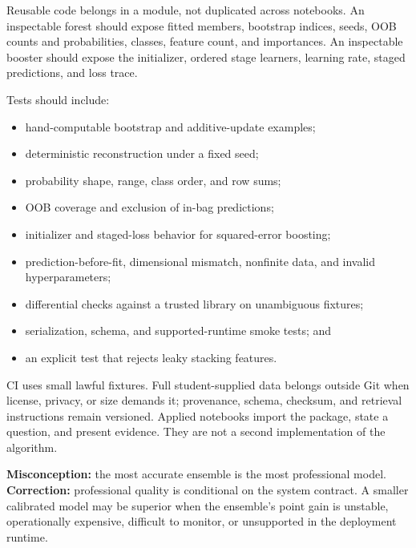 Reusable code belongs in a module, not duplicated across notebooks. An
inspectable forest should expose fitted members, bootstrap indices, seeds, OOB
counts and probabilities, classes, feature count, and importances. An
inspectable booster should expose the initializer, ordered stage learners,
learning rate, staged predictions, and loss trace.

Tests should include:
\begin{itemize}
  \item hand-computable bootstrap and additive-update examples;
  \item deterministic reconstruction under a fixed seed;
  \item probability shape, range, class order, and row sums;
  \item OOB coverage and exclusion of in-bag predictions;
  \item initializer and staged-loss behavior for squared-error boosting;
  \item prediction-before-fit, dimensional mismatch, nonfinite data, and invalid
  hyperparameters;
  \item differential checks against a trusted library on unambiguous fixtures;
  \item serialization, schema, and supported-runtime smoke tests; and
  \item an explicit test that rejects leaky stacking features.
\end{itemize}

CI uses small lawful fixtures. Full student-supplied data belongs outside Git
when license, privacy, or size demands it; provenance, schema, checksum, and
retrieval instructions remain versioned. Applied notebooks import the package,
state a question, and present evidence. They are not a second implementation of
the algorithm.

\begin{misconceptionbox}
\textbf{Misconception:} the most accurate ensemble is the most professional
model. \textbf{Correction:} professional quality is conditional on the system
contract. A smaller calibrated model may be superior when the ensemble's point
gain is unstable, operationally expensive, difficult to monitor, or unsupported
in the deployment runtime.
\end{misconceptionbox}

